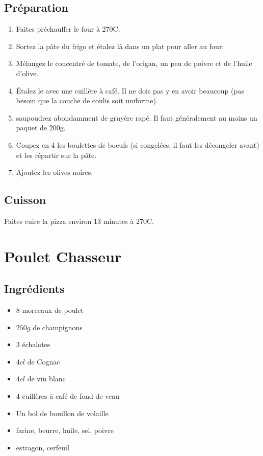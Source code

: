 \subsection*{Préparation}
\begin{enumerate}
\item Faites préchauffer le four à 270\degres C.
\item Sortez la pâte du frigo et étalez là dans un plat pour aller au four.
\item Mélangez le concentré de tomate, de l'origan, un peu de poivre et de l'huile d'olive.
\item Étalez le avec une cuillère à café. Il ne dois pas y en avoir beaucoup (pas besoin que la couche de coulis soit uniforme).
\item saupoudrez abondamment de gruyère rapé. Il faut généralement au moins un paquet de 200g.
\item Coupez en 4 les boulettes de boeufs (si congelées, il faut les décongeler avant) et les répartir sur la pâte.
\item Ajoutez les olives noires.
\end{enumerate}

\subsection*{Cuisson}
Faites cuire la pizza environ 13 minutes à 270\degres C.

\newpage
\section{Poulet Chasseur}
\subsection*{Ingrédients}
\begin{itemize}
\item 8 morceaux de poulet
\item $250\unit{g}$ de champignons
\item 3 échalotes
\item $4\unit{cl}$ de Cognac
\item $4\unit{cl}$ de vin blanc
\item 4 cuillères à café de fond de veau
\item Un bol de bouillon de volaille
\item farine, beurre, huile, sel, poivre
\item estragon, cerfeuil
\end{itemize}

